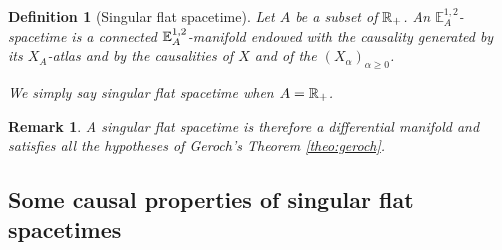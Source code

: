 \documentclass[a4paper,twoside]{article}
\newcommand{\mass}[1]{\mathbb{E}^{1,2}_{#1}}
\newtheorem{defi}[lem]{Definition}
\newtheorem{rem}[lem]{Remark}
\begin{document}
\begin{defi}[Singular flat spacetime]\label{def:singular_spacetime}
Let $A$ be a subset of $\mathbb R_+$.
An $\mass{A}$-spacetime is a connected $\mathbb{E}^{1,2}_A$-manifold endowed with the causality generated
by its $X_A$-atlas and by the causalities of $X$ and of the
$(X_\alpha)_{\alpha\geq 0}$.

We simply say singular flat spacetime when $A=\mathbb R_+$.
\end{defi}
\begin{rem}
A singular flat spacetime is therefore a differential manifold and satisfies all the
hypotheses of Geroch's Theorem \ref{theo:geroch}.
\end{rem}

\subsection{Some causal properties of singular flat spacetimes}
\end{document}
